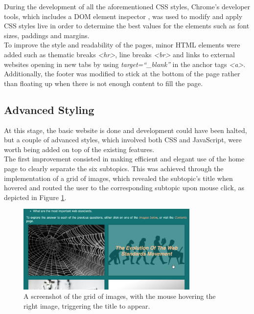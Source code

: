 \documentclass[letterpaper,12pt]{article}
\begin{document}
During the development of all the aforementioned CSS styles, Chrome's developer tools, which includes a DOM element inspector \cite{chrome-dev-tools}, was used to modify and apply CSS styles live in order to determine the best values for the elements such as font sizes, paddings and margins.\\

To improve the style and readability of the pages, minor HTML elements were added such as thematic breaks \textit{\textless hr\textgreater}, line breaks \textit{\textless br\textgreater} and links to external websites opening in new tabs by using \textit{target=``\_blank''} in the anchor tags \textit{\textless a\textgreater}. Additionally, the footer was modified to stick at the bottom of the page rather than floating up when there is not enough content to fill the page.

\subsection{Advanced Styling}
\label{sec:advanced-styling}

At this stage, the basic website is done and development could have been halted, but a couple of advanced styles, which involved both CSS and JavaScript, were worth being added on top of the existing features.\\

The first improvement consisted in making efficient and elegant use of the home page to clearly separate the six subtopics. This was achieved through the implementation of a grid of images, which revealed the subtopic's title when hovered and routed the user to the corresponding subtopic upon mouse click, as depicted in Figure \ref{fig:grid-images-hover}. 

\begin{figure}[h] 
\centerline{\includegraphics[width=0.8\textwidth]{report/images/grid-images-hover.png}}
\caption{\label{fig:grid-images-hover}A screenshot of the grid of images, with the mouse hovering the right image, triggering the title to appear.}
\end{figure}
\end{document}
